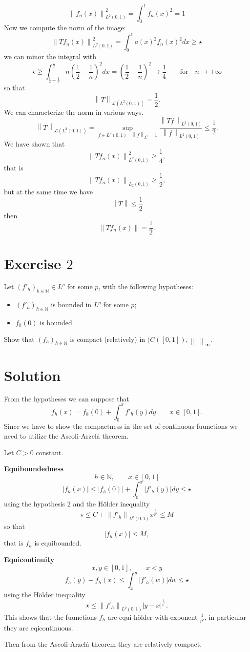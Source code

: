 \documentclass[a4paper, twoside, openany]{book}
\newcommand{\norm}[1]{\left\lVert#1\right\rVert}
\begin{document}
$$\norm{f_n(x)}_{L^2(0,1)}^2 = \int_0^1 f_n(x)^2 = 1$$
Now we compute the norm of the image:
$$\norm{T f_n(x)}_{L^2(0,1)}^2 = \int_0^1 a(x)^2 f_n(x)^2 dx \geq \star$$
we can minor the integral with
$$\star \geq \int_{\frac{1}{2} - \frac{1}{n}}^{\frac{1}{2}} n(\frac{1}{2} - \frac{1}{n})^2 dx = (\frac{1}{2} - \frac{1}{n})^2 \rightarrow \frac{1}{4} \qquad \textrm{for} \quad n \rightarrow +\infty$$
so that
$$\norm{T}_{\mathcal{L}(L^2(0,1))} = \frac{1}{2}.$$
We can characterize the norm in various ways.
$$\norm{T}_{\mathcal{L}(L^2(0,1))} = \sup_{f \in L^2(0,1) \quad \norm{f}_{L^2} = 1} \frac{\norm{Tf}_{L^2(0,1)}}{\norm{f}_{L^2(0,1)}} \leq \frac{1}{2}.$$
We have shown that 
$$\norm{Tf_n(x)}_{L^2(0,1)}^2 \geq \frac{1}{4},$$
that is
$$\norm{T f_n(x)}_{L_2(0,1)} \geq \frac{1}{2},$$
but at the same time we have
$$\norm{T} \leq \frac{1}{2}$$
then
$$\norm{T f_n(x)} = \frac{1}{2}.$$
\clearpage
\section*{Exercise $2$}
Let $(f'_h)_{h \in \mathbb{N}} \in L^p$ for some $p$, with the following hypotheses:
\begin{itemize}
\item $(f'_h)_{h \in \mathbb{N}}$ is bounded in $L^p$ for some $p$;
\item $f_h(0)$ is bounded.
\end{itemize}
Show that $(f_h)_{h \in \mathbb{N}}$ is compact (relatively) in $(C([0,1]), \norm{\cdot}_{\infty}$.
\section*{Solution}
From the hypotheses we can suppose that
$$f_h(x) = f_h(0) + \int_0^x f'_h(y) dy \qquad x \in [0, 1].$$
Since we have to show the compactness in the set of continuous fuunctions we need to utilize the Ascoli-Arzel\`{a} theorem. \par
Let $C > 0$ constant. \par 
\textbf{Equiboundedness}
$$h \in \mathbb{N}, \qquad x \in [0, 1]$$
$$|f_h(x)| \leq |f_h(0)| + \int_0^x |f'_h(y)| dy \leq \star$$
using the hypothesis $2$ and the H\"{o}lder inequality
$$\star \leq C + \norm{f'_h}_{L^p(0,1)} x^{\frac{1}{p'}} \leq M$$
so that
$$|f_h(x)| \leq M,$$
that is $f_h$ is equibounded. \par   
\textbf{Equicontinuity}
$$x, y \in [0, 1], \qquad x < y$$
$$f_h(y) - f_h(x) \leq \int_x^y |f'_h(w)| dw \leq \star$$
using the H\"{o}lder inequality
$$\star \leq \norm{f'_h}_{L^p(0,1)}|y - x|^{\frac{1}{p'}}.$$
This shows that the fuunctions $f_h$ are equi-h\"{o}lder  with exponent $\frac{1}{p'}$, in particular they are eqicontinuous. \par   
Then from the Ascoli-Arzel\`{a} theorem they are relatively compact.
\end{document}
